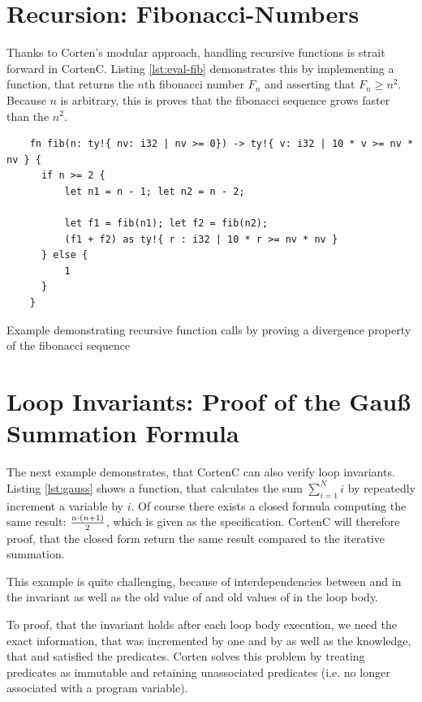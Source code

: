 \documentclass[twoside, english]{sdqthesis}
\theoremstyle{definition}
\begin{document}
\section{Recursion: Fibonacci-Numbers}

Thanks to Corten's modular approach, handling recursive functions is strait forward in CortenC. Listing \ref{lst:eval-fib} demonstrates this by implementing a function, that returns the $n$th fibonacci number $F_n$ and asserting that $F_n \geq n^2$. Because $n$ is arbitrary, this is proves that the fibonacci sequence grows faster than the $n^2$.


\begin{listing}[ht]
  \begin{verbatim}
    fn fib(n: ty!{ nv: i32 | nv >= 0}) -> ty!{ v: i32 | 10 * v >= nv * nv } {
      if n >= 2 {
          let n1 = n - 1; let n2 = n - 2;

          let f1 = fib(n1); let f2 = fib(n2);
          (f1 + f2) as ty!{ r : i32 | 10 * r >= nv * nv }
      } else {
          1
      }
    }
  \end{verbatim}
  \caption{Example demonstrating recursive function calls by proving a divergence property of the fibonacci sequence}
  \label{lst:eval-fib}
\end{listing}


\label{sec:evaluation-gauss} \section{Loop Invariants: Proof of the Gauß Summation Formula}

The next example demonstrates, that CortenC can also verify loop invariants. Listing \ref{lst:gauss} shows a function, that calculates the sum $\sum_{i = 1}^N i$ by repeatedly increment a variable by $i$. 
Of course there exists a closed formula computing the same result: $n \cdot (n + 1) \over 2$, which is given as the specification. CortenC will therefore proof, that the closed form return the same result compared to the iterative summation.

This example is quite challenging, because of interdependencies between  and  in the invariant as well as the old value of  and old values of  in the loop body. 

To proof, that the invariant holds after each loop body execution, we need the exact information, that  was incremented by one and  by  as well as the knowledge, that  and  satisfied the predicates. Corten solves this problem by treating predicates as immutable and retaining unassociated predicates (i.e. no longer associated with a program variable).
\end{document}
